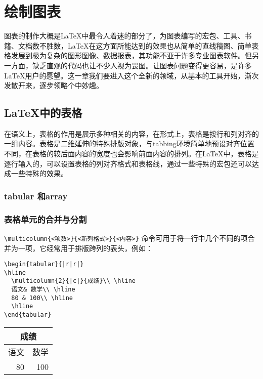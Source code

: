 \chapter{绘制图表}
图表的制作大概是\LaTeX 中最令人着迷的部分了，为图表编写的宏包、工具、书籍、文档数不胜数，\LaTeX 在这方面所能达到的效果也从简单的直线稿图、简单表格发展到极为复杂的图形图像、数据报表，其功能不亚于许多专业图表软件。但另一方面，缺乏直观的代码也让不少人视为畏图。让图表问题变得更容易，是许多\LaTeX 用户的愿望。这一章我们要进入这个全新的领域，从基本的工具开始，渐次发散开来，逐步领略个中妙趣。
\section{\LaTeX 中的表格}
在语义上，表格的作用是展示多种相关的内容，在形式上，表格是按行和列对齐的一组内容。表格是二维延伸的特殊排版对象，与tabbing环境简单地预设对齐位置不同，在表格的较后面内容的宽度也会影响前面内容的排列。在\LaTeX 中，表格是逐行输入的，可以设置表格的列对齐格式和表格线，通过一些特殊的宏包还可以达成一些特殊的效果。
\subsection{tabular 和array }
\subsection{表格单元的合并与分割}
\verb|\multicolumn{<项数>}{<新列格式>}{<内容>}|
命令可用于将一行中几个不同的项合并为一项，它经常用于排版跨列的表头，例如：
\begin{table}[ht]
\begin{minipage}{0.7\linewidth}
\begin{lstlisting}
\begin{tabular}{|r|r|}
\hline
  \multicolumn{2}{|c|}{成绩}\\ \hline
  语文& 数学\\ \hline
  80 & 100\\ \hline
  \hline
\end{tabular}
\end{lstlisting}
\end{minipage}
	\quad
	\begin{tabular}{|r|r|}
		\hline
		\multicolumn{2}{|c|}{成绩}\\ \hline
		语文& 数学\\ \hline
		80 & 100\\ \hline
	\end{tabular}
\end{table}

